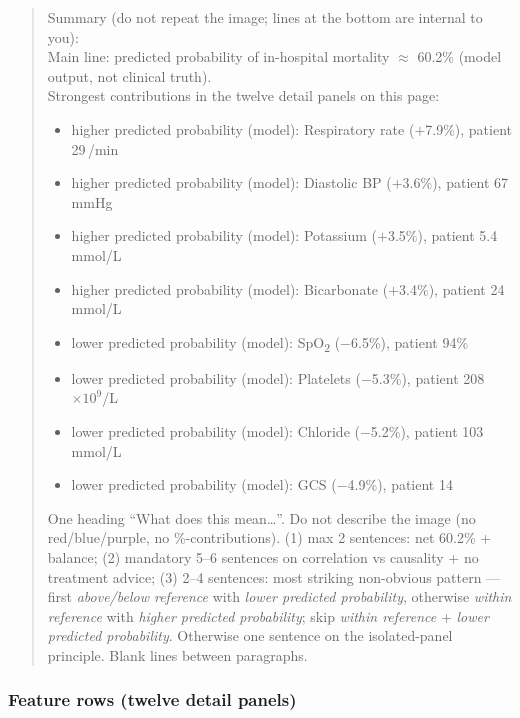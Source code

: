 \documentclass[12pt, a4paper]{article}
\begin{document}
\begin{quote}
Summary (do not repeat the image; lines at the bottom are internal to you):\\
Main line: predicted probability of in-hospital mortality $\approx$ 60.2\%
(model output, not clinical truth).\\
Strongest contributions in the twelve detail panels on this page:
\begin{itemize}
  \item[$\rightarrow$] higher predicted probability (model): Respiratory rate
    ($+$7.9\%), patient 29\,/min
  \item[$\rightarrow$] higher predicted probability (model): Diastolic BP
    ($+$3.6\%), patient 67\,mmHg
  \item[$\rightarrow$] higher predicted probability (model): Potassium
    ($+$3.5\%), patient 5.4\,mmol/L
  \item[$\rightarrow$] higher predicted probability (model): Bicarbonate
    ($+$3.4\%), patient 24\,mmol/L
  \item[$\rightarrow$] lower predicted probability (model): SpO\textsubscript{2}
    ($-$6.5\%), patient 94\%
  \item[$\rightarrow$] lower predicted probability (model): Platelets
    ($-$5.3\%), patient 208\,$\times10^{9}$/L
  \item[$\rightarrow$] lower predicted probability (model): Chloride
    ($-$5.2\%), patient 103\,mmol/L
  \item[$\rightarrow$] lower predicted probability (model): GCS ($-$4.9\%),
    patient 14
\end{itemize}
One heading ``What does this mean\ldots''. Do not describe the image (no
red/blue/purple, no \%-contributions). (1) max 2 sentences: net 60.2\% +
balance; (2) mandatory 5--6 sentences on correlation vs causality + no
treatment advice; (3) 2--4 sentences: most striking non-obvious pattern ---
first \textit{above/below reference} with \textit{lower predicted probability},
otherwise \textit{within reference} with \textit{higher predicted probability};
skip \textit{within reference} + \textit{lower predicted probability}. Otherwise
one sentence on the isolated-panel principle. Blank lines between paragraphs.
\end{quote}

\subsubsection*{Feature rows (twelve detail panels)}
\end{document}

